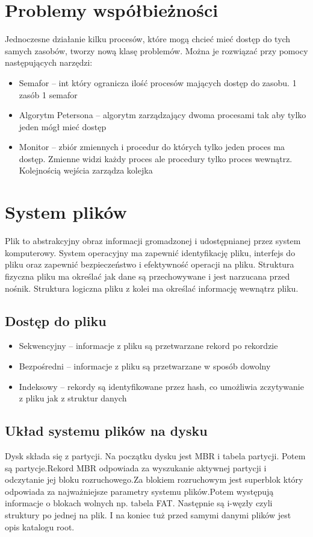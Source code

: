 \documentclass{../notatki}
\begin{document}
\section{Problemy współbieżności}

Jednoczesne działanie kilku procesów, które mogą chcieć mieć dostęp
do tych samych zasobów, tworzy nową klasę problemów. Można je
rozwiązać przy pomocy następujących narzędzi:

\begin{itemize}
  \item Semafor – int który ogranicza ilość procesów mających dostęp
    do zasobu. 1 zasób 1 semafor
  \item Algorytm Petersona – algorytm zarządzający dwoma procesami
    tak aby tylko jeden mógł mieć dostęp
  \item Monitor – zbiór zmiennych i procedur do których tylko jeden
    proces ma dostęp. Zmienne widzi każdy proces ale procedury tylko
    proces wewnątrz. Kolejnością wejścia zarządza kolejka
\end{itemize}

\section{System plików}

Plik to abstrakcyjny obraz informacji gromadzonej i udostępnianej
przez system komputerowy. System operacyjny ma zapewnić identyfikację
pliku, interfejs do pliku oraz zapewnić bezpieczeństwo i efektywność
operacji na pliku. Struktura fizyczna pliku ma określać jak dane są
przechowywane i jest narzucana przed nośnik. Struktura logiczna pliku
z kolei ma określać informację wewnątrz pliku.

\subsection{Dostęp do pliku}

\begin{itemize}
  \item Sekwencyjny – informacje z pliku są przetwarzane rekord po rekordzie
  \item Bezpośredni – informacje z pliku są przetwarzane w sposób dowolny
  \item Indeksowy – rekordy są identyfikowane przez hash, co
    umożliwia zczytywanie z pliku jak z struktur danych
\end{itemize}

\subsection{Układ systemu plików na dysku}

Dysk składa się z partycji. Na początku dysku jest MBR i tabela
partycji. Potem są partycje.Rekord MBR odpowiada za wyszukanie
aktywnej partycji i odczytanie jej bloku rozruchowego.Za blokiem
rozruchowym jest superblok który odpowiada za najważniejsze parametry
systemu plików.Potem występują informacje o blokach wolnych np.
tabela FAT. Następnie są i-węzły czyli struktury po jednej na plik. I
na koniec tuż przed samymi danymi plików jest opis katalogu root.
\end{document}
